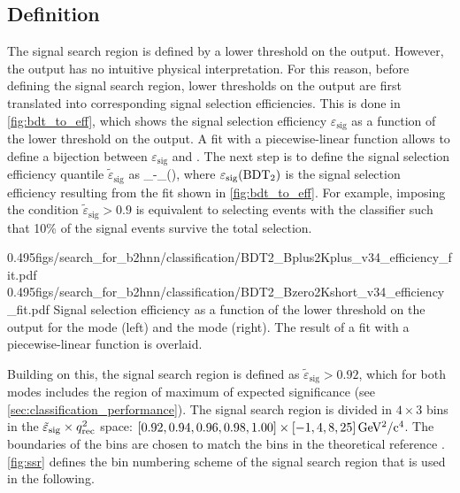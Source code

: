 \subsection{Definition} \label{sec:ssr_definition}
The signal search region is defined by a lower threshold on the \bdtt output.
However, the \bdtt output has no intuitive physical interpretation.
For this reason, before defining the signal search region, lower thresholds on the \bdtt output are first translated into corresponding signal selection efficiencies.
This is done in \cref{fig:bdt_to_eff}, which shows the signal selection efficiency $\varepsilon_{\mathrm{sig}}$ as a function of the lower threshold on the \bdtt output.
A fit with a piecewise-linear function allows to define a bijection between $\varepsilon_{\mathrm{sig}}$ and \bdtt.
The next step is to define the signal selection efficiency quantile $\tilde{\varepsilon}_{\mathrm{sig}}$ as
\be \label{eq:eff_quantile_definition}
\tilde{\varepsilon}_{}-\varepsilon_{}(\bdtt),
\ee
where $\varepsilon_{\mathrm{sig}}(\mathrm{BDT_2})$ is the signal selection efficiency resulting from the fit shown in \cref{fig:bdt_to_eff}.
For example, imposing the condition $\tilde{\varepsilon}_{\mathrm{sig}}>0.9$ is equivalent to selecting events with the \bdtt classifier such that 10\% of the signal events survive the total selection.

{0.495}{figs/search_for_b2hnn/classification/BDT2_Bplus2Kplus_v34_efficiency_fit.pdf}
{0.495}{figs/search_for_b2hnn/classification/BDT2_Bzero2Kshort_v34_efficiency_fit.pdf}
{
Signal selection efficiency as a function of the lower threshold on the \bdtt output for the \BKpnn mode (left) and the \BKznn mode (right).
The result of a fit with a piecewise-linear function is overlaid.
}


Building on this, the signal search region is defined as $\tilde{\varepsilon}_{\mathrm{sig}}>0.92$, which for both modes includes the region of maximum of expected significance (see \cref{sec:classification_performance}).
The signal search region is divided in $4\times 3$ bins in the $\tilde{\varepsilon}_{\mathrm{sig}}\times q_{\mathrm{rec}}^2$ space: $[0.92,0.94,0.96,0.98,1.00]\times[-1,4,8,25]\,\mathrm{GeV^2/c^4}$.
The boundaries of the \qrec bins are chosen to match the bins in the theoretical reference \cite{Buras:2014fpa}.
\cref{fig:ssr} defines the bin numbering scheme of the signal search region that is used in the following.

